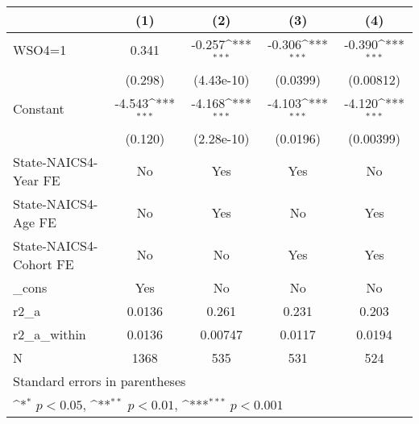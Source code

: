 {
\def\sym#1{\ifmmode^{#1}\else\(^{#1}\)\fi}
\begin{tabular}{l*{4}{c}}
\hline\hline
                    &\multicolumn{1}{c}{(1)}         &\multicolumn{1}{c}{(2)}         &\multicolumn{1}{c}{(3)}         &\multicolumn{1}{c}{(4)}         \\
\hline
WSO4=1              &       0.341         &      -0.257\sym{***}&      -0.306\sym{***}&      -0.390\sym{***}\\
                    &     (0.298)         &  (4.43e-10)         &    (0.0399)         &   (0.00812)         \\
[1em]
Constant            &      -4.543\sym{***}&      -4.168\sym{***}&      -4.103\sym{***}&      -4.120\sym{***}\\
                    &     (0.120)         &  (2.28e-10)         &    (0.0196)         &   (0.00399)         \\
[1em]
State-NAICS4-Year FE&          No         &         Yes         &         Yes         &          No         \\
[1em]
State-NAICS4-Age FE &          No         &         Yes         &          No         &         Yes         \\
[1em]
State-NAICS4-Cohort FE&          No         &          No         &         Yes         &         Yes         \\
[1em]
\_cons              &         Yes         &          No         &          No         &          No         \\
\hline
r2\_a                &      0.0136         &       0.261         &       0.231         &       0.203         \\
r2\_a\_within         &      0.0136         &     0.00747         &      0.0117         &      0.0194         \\
N                   &        1368         &         535         &         531         &         524         \\
\hline\hline
\multicolumn{5}{l}{\footnotesize Standard errors in parentheses}\\
\multicolumn{5}{l}{\footnotesize \sym{*} \(p<0.05\), \sym{**} \(p<0.01\), \sym{***} \(p<0.001\)}\\
\end{tabular}
}
